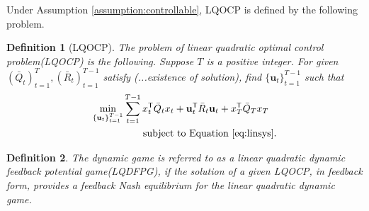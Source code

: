 \documentclass[letterpaper, 10 pt, conference]{ieeeconf}  %
\newcommand{\transpose}{\mathsf{T}}
\newtheorem{definition}{Definition}
\begin{document}
Under Assumption \ref{assumption:controllable}, LQOCP is defined by the following problem.

\begin{definition}[LQOCP]\label{def:LQOCP}
    The problem of linear quadratic optimal control problem(LQOCP) is the following.
    Suppose $T$ is a positive integer. For given $(\bar{Q}_{t})_{t=1}^{T},(\bar{R}_{t})_{t=1}^{T-1}$ satisfy (...existence of solution), find $\{\mathbf{u}_{t}\}_{t=1}^{T-1}$ such that
    \begin{equation}\label{eq:LQOCP}
\begin{split}
    \min_{\{\mathbf{u}_{t}\}_{t=1}^{T-1}}& \sum_{t=1}^{T-1} x_{t}^{\transpose}\bar{Q}_{t}x_{t} + \mathbf{u}_{t}^{\transpose}\bar{R}_{t}\mathbf{u}_{t} + x_{T}^{\transpose}\bar{Q}_{T}x_{T}\\
    &\text{\qquad subject to Equation \eqref{eq:linsys}}.
\end{split}
\end{equation}
\end{definition}



\begin{definition}
    The dynamic game is referred to as a linear quadratic dynamic feedback potential game(LQDFPG), if the solution of a given LQOCP, in feedback form, provides a feedback Nash equilibrium for the linear quadratic dynamic game. 
\end{definition}
\end{document}
